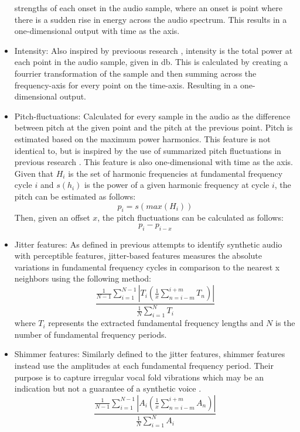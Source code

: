\documentclass{article}
\begin{document}
\begin{itemize}
					strengths of each onset in the audio sample, where an onset is point where
					there is a sudden rise in energy across the audio spectrum. This results in a
					one-dimensional output with time as the axis.
				\item
					Intensity: Also inspired by previoous research \cite{li_comparative_2022},
					intensity is the total power at each point in the audio sample, given in db.
					This is calculated by creating a fourrier transformation of the sample and then
					summing across the frequency-axis for every point on the time-axis. Resulting
					in a one-dimensional output.
				\item
					Pitch-fluctuations: Calculated for every sample in the audio as the difference
					between pitch at the given point and the pitch at the previous point. Pitch is
					estimated based on the maximum power harmonics. This feature is not identical
					to, but is inspired by the use of summarized pitch fluctuations in previous
					research \cite{khanjani_learning_2023}. This feature is also one-dimensional
					with time as the axis. Given that \(H_{i}\) is the set of harmonic frequencies
					at fundamental frequency cycle \(i\) and \(s(h_{i})\) is the power of a given
					harmonic frequency at cycle \(i\), the pitch can be estimated as follows:
					\[p_{i} = s(max(H_{i}))\]
					Then, given an offset \(x\), the pitch fluctuations can be calculated as
					follows:
					\[p_{i}-p_{i-x}\]
				\item
					Jitter features: As defined in previous attempts to identify synthetic audio
					\cite{chaiwongyen_deepfake-speech_2023} with perceptible features,
					jitter-based features measures the absolute variations in fundamental
					frequency cycles in comparison to the nearest x neighbors using the following
					method:
					\[ \frac{ \frac{1}{N-1}\sum_{i=1}^{N-1}|T_{i}(\frac{1}{x}\sum_{n=i-m}^{i+m}T_{n})|}
					{\frac{1}{N}\sum_{i=1}^{N}T_{i}} \]
					where \(T_{i}\) represents the extracted fundamental frequency lengths and
					\(N\) is the number of fundamental frequency periods.
				\item
					Shimmer features: Similarly defined to the jitter features, shimmer features
					instead use the amplitudes at each fundamental frequency period. Their purpose
					is to capture irregular vocal fold vibrations which may be an indication but
					not a guarantee of a synthetic voice \cite{chaiwongyen_deepfake-speech_2023}.
					\[ \frac{ \frac{1}{N-1}\sum_{i=1}^{N-1}|A_{i}(\frac{1}{x}\sum_{n=i-m}^{i+m}A_{n})|}
					{\frac{1}{N}\sum_{i=1}^{N}A_{i}} \]
			\end{itemize}
\end{document}

